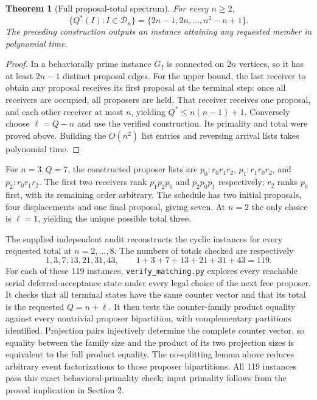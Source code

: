 \documentclass[11pt,a4paper]{article}
\newtheorem{theorem}{Theorem}[section]
\begin{document}
\begin{theorem}[Full proposal-total spectrum]
For every $n\ge2$,
\[
 \{Q^*(I):I\in\mathcal D_n\}
   =\{2n-1,2n,\ldots,n^2-n+1\}.
\]
The preceding construction outputs an instance attaining any requested member in polynomial time.
\end{theorem}
\begin{proof}
In a behaviorally prime instance $G_I$ is connected on $2n$ vertices, so it has at least $2n-1$ distinct proposal edges. For the upper bound, the last receiver to obtain any proposal receives its first proposal at the terminal step: once all receivers are occupied, all proposers are held. That receiver receives one proposal, and each other receiver at most $n$, yielding $Q^*\le n(n-1)+1$. Conversely choose $\ell=Q-n$ and use the verified construction. Its primality and total were proved above. Building the $O(n^2)$ list entries and reversing arrival lists takes polynomial time.
\end{proof}

For $n=3,Q=7$, the constructed proposer lists are
$p_0:r_0r_1r_2$, $p_1:r_1r_0r_2$, and $p_2:r_0r_1r_2$.
The first two receivers rank $p_1p_2p_0$ and $p_2p_0p_1$ respectively; $r_2$ ranks $p_0$ first, with its remaining order arbitrary. The schedule has two initial proposals, four displacements and one final proposal, giving seven. At $n=2$ the only choice is $\ell=1$, yielding the unique possible total three.

The supplied independent audit \cite{audit} reconstructs the cyclic instances for every requested total at $n=2,\ldots,8$. The numbers of totals checked are respectively
\[
 1,3,7,13,21,31,43,\qquad 1+3+7+13+21+31+43=119.
\]
For each of these 119 instances, \texttt{verify\_matching.py} explores every reachable serial deferred-acceptance state under every legal choice of the next free proposer. It checks that all terminal states have the same counter vector and that its total is the requested $Q=n+\ell$. It then tests the counter-family product equality against every nontrivial proposer bipartition, with complementary partitions identified. Projection pairs injectively determine the complete counter vector, so equality between the family size and the product of its two projection sizes is equivalent to the full product equality. The no-splitting lemma above reduces arbitrary event factorizations to those proposer bipartitions. All 119 instances pass this exact behavioral-primality check; input primality follows from the proved implication in Section 2.
\end{document}
